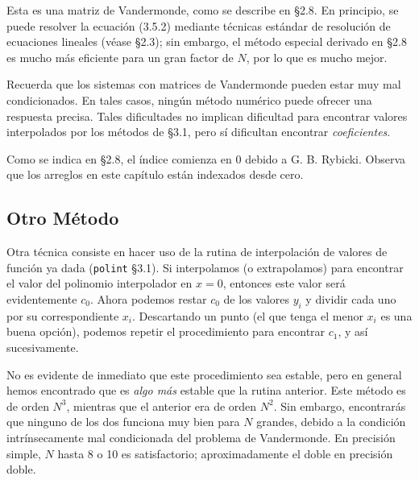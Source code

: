 \documentclass[10pt,a4paper]{book}
\begin{document}
Esta es una matriz de Vandermonde, como se describe en \S2.8. En principio, se puede resolver la ecuación (3.5.2) mediante técnicas estándar de resolución de ecuaciones lineales (véase \S2.3); sin embargo, el método especial derivado en \S2.8 es mucho más eficiente para un gran factor de $N$, por lo que es mucho mejor.

Recuerda que los sistemas con matrices de Vandermonde pueden estar muy mal condicionados. En tales casos, ningún método numérico puede ofrecer una respuesta precisa. Tales dificultades no implican dificultad para encontrar valores interpolados por los métodos de \S3.1, pero sí dificultan encontrar \textit{coeficientes}.

Como se indica en \S2.8, el índice comienza en 0 debido a G. B. Rybicki. Observa que los arreglos en este capítulo están indexados desde cero.

\subsection{Otro Método}

Otra técnica consiste en hacer uso de la rutina de interpolación de valores de función ya dada (\texttt{polint} §3.1). Si interpolamos (o extrapolamos) para encontrar el valor del polinomio interpolador en $x = 0$, entonces este valor será evidentemente $c_0$. Ahora podemos restar $c_0$ de los valores $y_i$ y dividir cada uno por su correspondiente $x_i$. Descartando un punto (el que tenga el menor $x_i$ es una buena opción), podemos repetir el procedimiento para encontrar $c_1$, y así sucesivamente.

No es evidente de inmediato que este procedimiento sea estable, pero en general hemos encontrado que es \textit{algo más} estable que la rutina anterior. Este método es de orden $N^3$, mientras que el anterior era de orden $N^2$. Sin embargo, encontrarás que ninguno de los dos funciona muy bien para $N$ grandes, debido a la condición intrínsecamente mal condicionada del problema de Vandermonde. En precisión simple, $N$ hasta 8 o 10 es satisfactorio; aproximadamente el doble en precisión doble.
\end{document}
